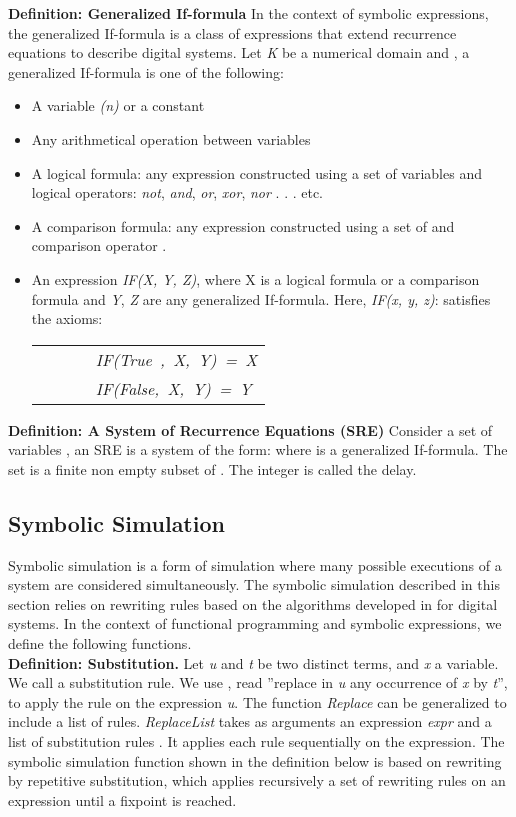 \documentclass[submission,copyright,creativecommons]{eptcs}
\begin{document}
\noindent \textbf{Definition: Generalized If-formula}
In the context of symbolic expressions, the generalized If-formula is a class of expressions that extend recurrence equations to describe digital systems. Let \emph{K} be a numerical domain  and , a generalized If-formula is one of the following: \begin{itemize}
  \item A variable \emph{(n)} or a constant 
  \item Any arithmetical operation  between variables 
  \item A logical formula: any expression constructed using a set of variables  and logical operators: \emph{not}, \emph{and}, \emph{or}, \emph{xor}, \emph{nor} . . . etc.
  \item A comparison formula: any expression constructed using a set of  and comparison operator .
  \item An expression \emph{IF(X, Y, Z)}, where X is a logical formula or a comparison formula and \emph{Y}, \emph{Z} are any generalized If-formula. Here, \emph{IF(x, y, z)}:  satisfies the axioms:

\begin{tabular}{ll}
~~~~~ & \emph{IF(True~,~X,~Y)~=~X} \\
~~~~~ & \emph{IF(False,~X,~Y)~=~Y} \\
\end{tabular}
\end{itemize}
\noindent \textbf{Definition: A System of Recurrence Equations (SRE)}
Consider a set of variables , an SRE is a system of the form:  where  is a generalized If-formula. The set  is a finite non empty subset of . The integer  is called the delay.

\subsection{Symbolic Simulation}

Symbolic simulation is a form of simulation where many possible executions of a system are considered simultaneously. The symbolic simulation described in this section relies on rewriting rules based on the algorithms developed in \cite{1} for digital systems. In the context of functional programming and symbolic expressions, we define the following functions.\\

\noindent \textbf{Definition: Substitution.}
Let \emph{u} and \emph{t} be two distinct terms, and \emph{x} a variable. We call  a substitution rule. We use , read ”replace in \emph{u} any occurrence of \emph{x} by \emph{t}”, to apply the rule  on the expression \emph{u}.
The function \emph{Replace} can be generalized to include a list of rules. \emph{ReplaceList} takes as arguments an expression \emph{expr} and a list of substitution rules . It applies each rule sequentially on the expression. The symbolic simulation function  shown in the definition below is based on rewriting by repetitive substitution, which applies recursively a set of rewriting rules  on an expression  until a fixpoint is reached.\\
\end{document}
